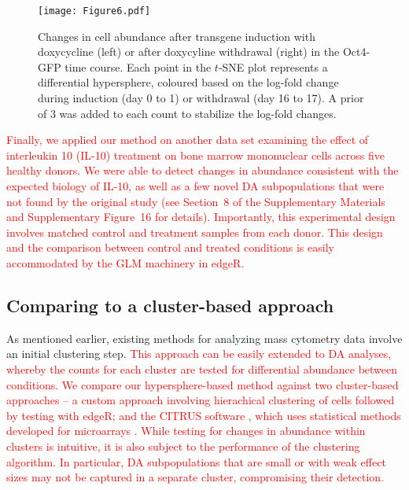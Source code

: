 \documentclass{article}
\newcommand\revised[1]{\textcolor{red}{#1}}
\newcommand{\suppbmmc}{8}
\newcommand{\suppfigbmmc}{16}
\begin{document}
\begin{figure}[bt]
    \begin{center}
        \texttt{[image: Figure6.pdf]}
    \end{center}
    \caption{
        Changes in cell abundance after transgene induction with doxycycline (left) or after doxycyline withdrawal (right) in the Oct4-GFP time course.
        Each point in the $t$-SNE plot represents a differential hypersphere, coloured based on the log-fold change during induction (day 0 to 1) or withdrawal (day 16 to 17).
        A prior of 3 was added to each count to stabilize the log-fold changes.
    }
    \label{fig:importanttime}
\end{figure}

\revised{Finally, we applied our method on another data set \cite{levine2015datadriven} examining the effect of interleukin 10 (IL-10) treatment on bone marrow mononuclear cells across five healthy donors.
    We were able to detect changes in abundance consistent with the expected biology of IL-10, as well as a few novel DA subpopulations that were not found by the original study (see Section~\suppbmmc{} of the Supplementary Materials and Supplementary Figure~\suppfigbmmc{} for details).
    Importantly, this experimental design involves matched control and treatment samples from each donor.
    This design and the comparison between control and treated conditions is easily accommodated by the GLM machinery in edgeR.
}

\subsection{Comparing to a cluster-based approach}
As mentioned earlier, existing methods for analyzing mass cytometry data involve an initial clustering step.
\revised{This approach can be easily extended to DA analyses, whereby the counts for each cluster are tested for differential abundance between conditions.
We compare our hypersphere-based method against two cluster-based approaches -- a custom approach involving hierachical clustering of cells followed by testing with edgeR; and the CITRUS software \cite{bruggner2014automated}, which uses statistical methods developed for microarrays \cite{tusher2001significance}.
While testing for changes in abundance within clusters is intuitive, it is also subject to the performance of the clustering algorithm.
In particular, DA subpopulations that are small or with weak effect sizes may not be captured in a separate cluster, compromising their detection.
}
\end{document}

